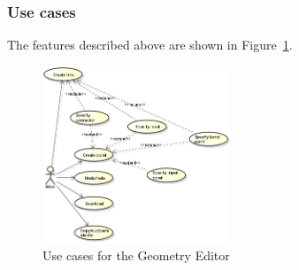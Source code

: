 \subsubsection{Use cases}

The features described above are shown in Figure~\ref{fig:use-cases-geometry-editor}.

\begin{figure}[htp]
\begin{center}
  \includegraphics[width=0.5\textwidth]{image/uc-geometry.png}
  \caption{Use cases for the Geometry Editor }
  \label{fig:use-cases-geometry-editor}
\end{center}
\end{figure}